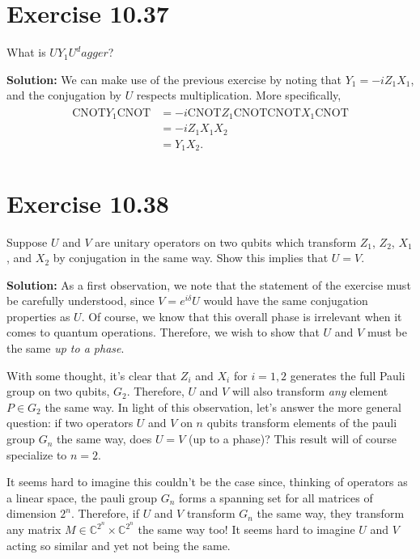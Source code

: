 \documentclass{book}
\begin{document}
\section*{Exercise 10.37}
    What is $U Y_1 U^dagger$?
    
    \textbf{Solution:} We can make use of the previous exercise by noting that $Y_1 = -i Z_1 X_1$, and the conjugation by $U$ respects multiplication. More specifically,
    \begin{align}
    \begin{aligned}
        \text{CNOT}Y_1 \text{CNOT} &= -i \text{CNOT}Z_1\text{CNOT} \text{CNOT} X_1 \text{CNOT} \\
        &=-i Z_1 X_1 X_2 \\
        &=Y_1 X_2.
    \end{aligned}
    \end{align}
    
\section*{Exercise 10.38}
    Suppose $U$ and $V$ are unitary operators on two qubits which transform $Z_1$, $Z_2$, $X_1$, and $X_2$ by conjugation in the same way. Show this implies that $U = V$.
    
    \textbf{Solution:} As a first observation, we note that the statement of the exercise must be carefully understood, since $V = e^{i\delta} U$ would have the same conjugation properties as $U$. Of course, we know that this overall phase is irrelevant when it comes to quantum operations. Therefore, we wish to show that $U$ and $V$ must be the same \emph{up to a phase}.
    
    With some thought, it's clear that $Z_i$ and $X_i$ for $i=1,2$ generates the full Pauli group on two qubits, $G_2$. Therefore, $U$ and $V$ will also transform \emph{any} element $P\in G_2$ the same way. In light of this observation, let's answer the more general question: if two operators $U$ and $V$ on $n$ qubits transform elements of the pauli group $G_n$ the same way, does $U = V$ (up to a phase)? This result will of course specialize to $n=2$.
    
    It seems hard to imagine this couldn't be the case since, thinking of operators as a linear space, the pauli group $G_n$ forms a spanning set for all matrices of dimension $2^n$. Therefore, if $U$ and $V$ transform $G_n$ the same way, they transform any matrix $M \in \mathbb{C}^{2^n} \times \mathbb{C}^{2^n}$ the same way too! It seems hard to imagine $U$ and $V$ acting so similar and yet not being the same.
    
\end{document}
